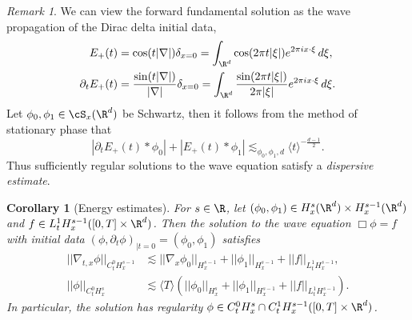 \documentclass[reqno]{amsart}
\newtheorem{corollary}[theorem]{Corollary}
\theoremstyle{definition}
\theoremstyle{remark}
\newtheorem*{remark}{Remark}
\begin{document}
\begin{remark}
	We can view the forward fundamental solution as the wave propagation of the Dirac delta initial data,
		\begin{align*}
			E_+ (t)
				&= \cos (t |\nabla|) \delta_{x = 0} = \int_{\R^d} \cos(2\pi t |\xi|) e^{2\pi i x \cdot \xi} \, d \xi, \\
			\partial_t E_+ (t)
				&= \frac{\sin(t|\nabla|)}{|\nabla|} \delta_{x = 0} = \int_{\R^d} \frac{\sin(2\pi t |\xi|)}{2\pi |\xi|} e^{2\pi i x \cdot \xi} \, d \xi	.
		\end{align*}
	Let $\phi_0, \phi_1 \in \cS_x (\R^d)$ be Schwartz, then it follows from the method of stationary phase that 
		\[ | \partial_t E_+ (t) * \phi_0| + |E_+ (t) * \phi_1| \lesssim_{\phi_0, \phi_1, d} \langle t \rangle^{- \frac{d - 1}{2}}.\]	
	Thus sufficiently regular solutions to the 	wave equation satisfy a \textit{dispersive estimate}.
\end{remark}

\begin{corollary}[Energy estimates]	
	For $s \in \R$, let $(\phi_0, \phi_1) \in H^s_x (\R^d) \times H^{s - 1}_x (\R^d)$ and $f \in L^1_t H^{s - 1}_x ([0, T] \times \R^d)$. Then the solution to the wave equation $\Box \phi = f$ with initial data $(\phi, \partial_t \phi)_{|t = 0} = (\phi_0, \phi_1)$ satisfies
		\begin{align*}
			||\nabla_{t, x} \phi||_{C^0_t H^{s - 1}_x} 
				&\lesssim ||\nabla_x \phi_0||_{H^{s - 1}_x} + ||\phi_1||_{H^{s - 1}_x} + ||f||_{L^1_t H^{s - 1}_x}, \\
			||\phi||_{C^0_t H^{s}_x}
				&\lesssim \langle T \rangle \left(|| \phi_0||_{H^{s}_x} + ||\phi_1||_{H^{s - 1}_x} + ||f||_{L^1_t H^{s - 1}_x}	\right).
		\end{align*}
	In particular, the solution has regularity $\phi \in C_t^0 H^s_x \cap C^1_t H^{s - 1}_x ([0, T] \times \R^d)$.	\label{cor:energy}
\end{corollary}
\end{document}
